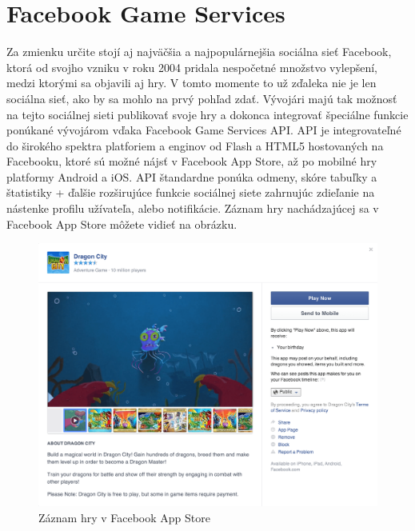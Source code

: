 \section{Facebook Game Services}
Za zmienku určite stojí aj najväčšia a najpopulárnejšia sociálna sieť Facebook, ktorá od svojho vzniku v roku 2004 pridala nespočetné množstvo vylepšení, medzi ktorými sa objavili aj hry. V tomto momente to už zďaleka nie je len sociálna sieť, ako by sa mohlo na prvý pohľad zdať. Vývojári majú tak možnosť na tejto sociálnej sieti publikovať svoje hry a dokonca integrovať špeciálne funkcie ponúkané vývojárom vďaka Facebook Game Services API. API je integrovateľné do širokého spektra platforiem a enginov od Flash a HTML5 hostovaných na Facebooku, ktoré sú možné nájsť v Facebook App Store, až po mobilné hry platformy Android a iOS. API štandardne ponúka odmeny, skóre tabuľky a štatistiky + ďalšie rozširujúce funkcie sociálnej siete zahrnujúc zdieľanie na nástenke profilu užívateľa, alebo notifikácie. Záznam hry nachádzajúcej sa v Facebook App Store môžete vidieť na obrázku.
\begin{figure}[h]
  \centering
  \includegraphics[scale=0.17]{fig/facebook.png}
  \caption{Záznam hry v Facebook App Store}
  \label{fig:facebook}
\end{figure}

